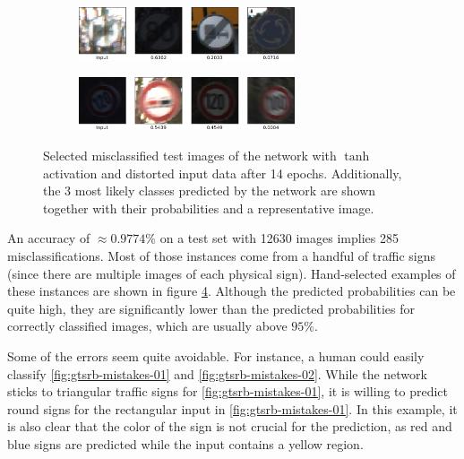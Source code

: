 \documentclass[11pt, a4paper]{article}
\begin{document}
\begin{figure}
\begin{subfigure}{\textwidth}
		\label{fig:gtsrb-mistakes-05}
	\end{subfigure}
	\begin{subfigure}{\textwidth}
		\centering
		\caption{}
		\includegraphics[width=0.7\textwidth]{gtsrb_mistakes/mistake_ueberholen_lkw}
		\label{fig:gtsrb-mistakes-06}
	\end{subfigure}
	\begin{subfigure}{\textwidth}
		\centering
		\caption{}
		\includegraphics[width=0.7\textwidth]{gtsrb_mistakes/mistake_limit_120}
		\label{fig:gtsrb-mistakes-07}
	\end{subfigure}
	\caption{Selected misclassified test images of the network with $\tanh$ activation and distorted input data after 14 epochs. Additionally, the 3 most likely classes predicted by the network are shown together with their probabilities and a representative image.}
	\label{fig:gtsrb-mistakes}
\end{figure}

An accuracy of $\approx 0.9774$\% on a test set with 12630 images implies 285 misclassifications. Most of those instances come from a handful of traffic signs (since there are multiple images of each physical sign). Hand-selected examples of these instances are shown in figure \ref{fig:gtsrb-mistakes}. Although the predicted probabilities can be quite high, they are significantly lower than the predicted probabilities for correctly classified images, which are usually above $95$\%.

Some of the errors seem quite avoidable. For instance, a human could easily classify \ref{fig:gtsrb-mistakes-01} and \ref{fig:gtsrb-mistakes-02}. While the network sticks to triangular traffic signs for \ref{fig:gtsrb-mistakes-01}, it is willing to predict round signs for the rectangular input in \ref{fig:gtsrb-mistakes-01}. In this example, it is also clear that the color of the sign is not crucial for the prediction, as red and blue signs are predicted while the input contains a yellow region.
\end{document}
